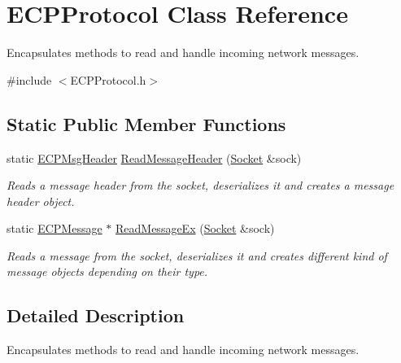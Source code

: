 \hypertarget{class_e_c_p_protocol}{\section{E\-C\-P\-Protocol Class Reference}
\label{class_e_c_p_protocol}
}


Encapsulates methods to read and handle incoming network messages.  




{\ttfamily \#include $<$E\-C\-P\-Protocol.\-h$>$}

\subsection*{Static Public Member Functions}
\begin{DoxyCompactItemize}
\item 
static \hyperlink{class_common_1_1_e_c_p_msg_header}{E\-C\-P\-Msg\-Header} \hyperlink{class_e_c_p_protocol_a455f930ac9dcda3574bc0c90e0db7a73}{Read\-Message\-Header} (\hyperlink{class_common_1_1_socket}{Socket} \&sock)
\begin{DoxyCompactList}\small\item\em Reads a message header from the socket, deserializes it and creates a message header object. \end{DoxyCompactList}\item 
static \hyperlink{class_common_1_1_e_c_p_message}{E\-C\-P\-Message} $\ast$ \hyperlink{class_e_c_p_protocol_ab6105325b469aab2c38841cc5c285f31}{Read\-Message\-Ex} (\hyperlink{class_common_1_1_socket}{Socket} \&sock)
\begin{DoxyCompactList}\small\item\em Reads a message from the socket, deserializes it and creates different kind of message objects depending on their type. \end{DoxyCompactList}\end{DoxyCompactItemize}


\subsection{Detailed Description}
Encapsulates methods to read and handle incoming network messages. 

